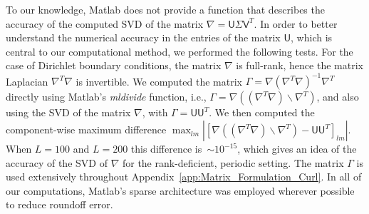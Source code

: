 \documentclass[english,12pt,jmp,graphicx]{revtex4-1}
\newcommand{\appref}[1]{Appendix~\ref{#1}}
\newcommand{\Um}{\mathsf{U}}
\newcommand{\Vm}{\mathsf{V}}
\begin{document}
To our knowledge, Matlab does  not provide a function that describes
the accuracy of the computed SVD of the matrix
$\nabla=\Um\Sigma\Vm^T$. In order to better understand the numerical
accuracy in the entries of the matrix $\Um$, which is central to our
computational method, we performed the following tests. For the case
of Dirichlet boundary conditions, the matrix $\nabla$ is full-rank,
hence the matrix Laplacian $\nabla^T\nabla$ is invertible. We computed
the matrix $\Gamma=\nabla(\nabla^T\nabla)^{-1}\nabla^T$ directly using
Matlab's \emph{mldivide} function, i.e.,
$\Gamma=\nabla((\nabla^T\nabla)\backslash \nabla^T)$, and also using
the SVD of the matrix $\nabla$, with $\Gamma=\Um\Um^T$. We then
computed the component-wise maximum difference $\max_{l
  m}|[\nabla((\nabla^T\nabla)\backslash\nabla^T)-\Um\Um^T]_{l
  m}|$. When $L=100$ and $L=200$ this difference is~$\sim10^{-15}$,
which gives an idea of the accuracy of the SVD of $\nabla$ for the
rank-deficient, periodic setting. The matrix $\Gamma$ is used
extensively throughout \appref{app:Matrix_Formulation_Curl}. In 
all of our computations, Matlab's sparse architecture was employed
wherever possible to reduce  roundoff error.
\end{document}

